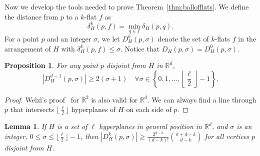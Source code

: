 \documentclass[preprint, 12pt]{elsarticle}
\newtheorem{lemma}{Lemma}%
\newtheorem{proposition}{Proposition}[section]
\begin{document}
Now we develop the tools needed to prove Theorem~\ref{thm:ballofflats}. We define the distance from $p$ to a $k$-flat $f$ as
\begin{equation}
  \label{eq:distflat}
  \delta_{H}^{k}(p,f) = \min_{q \in f}\delta_{H}(p,q). \nonumber
\end{equation}
For a point $p$ and an integer $\sigma$, we let $D_{H}^{k}(p,\sigma)$ denote the set of $k$-flats $f$ in the arrangement of $H$ with $\delta_{H}^{k}(p,f) \leq \sigma$. Notice that $D_{H}(p,\sigma) = D_{H}^{0}(p,\sigma)$.

\begin{proposition}
\label{prop:planes}
  For any point $p$ disjoint from $H$ in $\mathbb{R}^{d}$, 
  \[ |D_{H}^{d-1}(p,\sigma)| \geq 2(\sigma+1) \quad \forall \sigma \in \left\{0, 1, \ldots, \left\lfloor \frac{\ell}{2} \right\rfloor - 1\right\}. \]
\end{proposition}

\begin{proof}
  Welzl's proof~\cite{welzl92} for $\mathbb{R}^{2}$ is also valid for $\mathbb{R}^{d}$. We can always find a line through $p$ that intersects $\lfloor \frac{\ell}{2} \rfloor$ hyperplanes of $H$ on each side of $p$. %
\end{proof}

\begin{lemma}
\label{lem:ballofflats}
  If $H$ is a set of $\ell$ hyperplanes in general position in $\mathbb{R}^{d}$, and $\sigma$ is an integer, $0 \leq \sigma \leq \lfloor \frac{\ell}{2}\rfloor - 1$, then $|D_{H}^{k}(p,\sigma)| \geq \frac{2^{d-k}}{(d-k)!}\binom{\sigma + d-k}{d-k}$ for all vertices $p$ disjoint from $H$.
\end{lemma}
\end{document}
